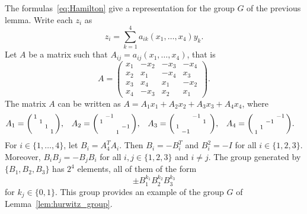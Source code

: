  \begin{example}
 	The formulas~\eqref{eq:Hamilton} give a representation for the
 	group $G$ of the previous lemma. Write each $z_i$ as 
 	\[
    z_i=\sum_{k=1}^4a_{ik}(x_1,\dots,x_4)y_k.
    \]
    Let $A$ be a matrix
 	such that 
 	$A_{ij}=a_{ij}(x_1,\dots,x_4)$, that is 
 	\[
 		A=\begin{pmatrix}
 			x_1 & -x_2 & -x_3 & -x_4\\
 			x_2 & x_1 & -x_4 & x_3\\
 			x_3 & x_4 & x_1 & -x_2\\
 			x_4 & -x_3 & x_2 & x_1
 		\end{pmatrix}.
 	\]
 	The matrix $A$ can be written as $A=A_1x_1+A_2x_2+A_3x_3+A_4x_4$, where
 	\begin{align*}
 		&A_1=\begin{psmallmatrix}
 		1\\
 		&1\\
 		&&1\\
 		&&&1\\
 		\end{psmallmatrix},
 		&&
 		A_2=\begin{psmallmatrix}
 			& -1\\
 			1 \\
 			&&&-1\\
 			&&1
 		\end{psmallmatrix},
 		&&
 		A_3=\begin{psmallmatrix}
 			&& -1 \\
 			&&&1 & \\
 			1\\
 			&-1
 		  \end{psmallmatrix},
 		  &&
 		  A_4=\begin{psmallmatrix}
 			&&&-1\\
 			&&-1\\
 			&1\\
 			1
 		\end{psmallmatrix}.
 	\end{align*}
 	For $i\in\{1,\dots,4\}$, let $B_i=A_4^TA_i$. Then
 	$B_i=-B_i^T$ and  $B_i^2=-I$ 
 	for all $i\in\{1,2,3\}$. Moreover, $B_iB_j=-B_jB_i$ for all $i,j\in\{1,2,3\}$ and
 	$i\ne j$.  
 	The group generated by $\{B_1,B_2,B_3\}$ has $2^4$ elements, all of them
 	of the form
 	\[
 		\pm B_1^{k_1}B_2^{k_2}B_3^{k_3}
 	\]
 	for $k_j\in\{0,1\}$. This group provides an example 
    of the group $G$ of Lemma~\ref{lem:hurwitz_group}. 
    
 \end{example}

